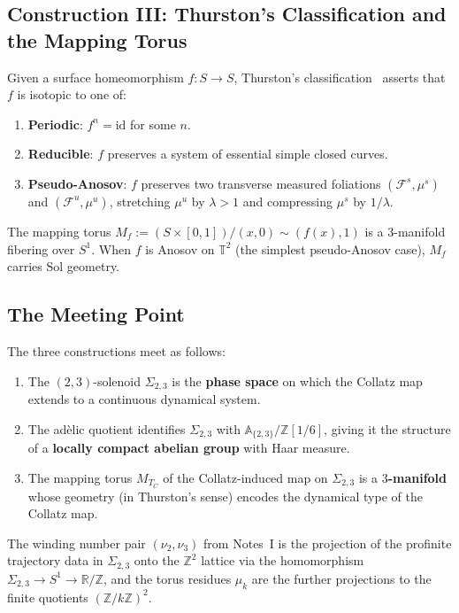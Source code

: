 \documentclass[11pt,a4paper]{article}
\newcommand{\Z}{\mathbb{Z}}
\newcommand{\R}{\mathbb{R}}
\newcommand{\T}{\mathbb{T}}
\newcommand{\A}{\mathbb{A}}
\newcommand{\Sol}{\mathrm{Sol}}
\theoremstyle{plain}
\theoremstyle{definition}
\begin{document}
\subsection{Construction III: Thurston's Classification and the Mapping Torus}

Given a surface homeomorphism $f: S \to S$, Thurston's classification~\cite{Thurston1988} asserts that $f$ is isotopic to one of:
\begin{enumerate}[label=(\roman*)]
    \item \textbf{Periodic}: $f^n = \mathrm{id}$ for some $n$.
    \item \textbf{Reducible}: $f$ preserves a system of essential simple closed curves.
    \item \textbf{Pseudo-Anosov}: $f$ preserves two transverse measured foliations $(\mathcal{F}^s, \mu^s)$ and $(\mathcal{F}^u, \mu^u)$, stretching $\mu^u$ by $\lambda > 1$ and compressing $\mu^s$ by $1/\lambda$.
\end{enumerate}
The mapping torus $M_f := (S \times [0,1]) / (x,0) \sim (f(x),1)$ is a $3$-manifold fibering over $S^1$. When $f$ is Anosov on $\T^2$ (the simplest pseudo-Anosov case), $M_f$ carries $\Sol$ geometry.


\subsection{The Meeting Point}

\begin{mainresult}
The three constructions meet as follows:
\begin{enumerate}
    \item The $(2,3)$-solenoid $\Sigma_{2,3}$ is the \textbf{phase space} on which the Collatz map extends to a continuous dynamical system.

    \item The ad\`elic quotient identifies $\Sigma_{2,3}$ with $\A_{\{2,3\}} / \Z[1/6]$, giving it the structure of a \textbf{locally compact abelian group} with Haar measure.

    \item The mapping torus $M_{T_C}$ of the Collatz-induced map on $\Sigma_{2,3}$ is a \textbf{$3$-manifold} whose geometry (in Thurston's sense) encodes the dynamical type of the Collatz map.
\end{enumerate}

The winding number pair $(\nu_2, \nu_3)$ from Notes~I is the projection of the profinite trajectory data in $\Sigma_{2,3}$ onto the $\Z^2$ lattice via the homomorphism $\Sigma_{2,3} \to S^1 \to \R/\Z$, and the torus residues $\mu_k$ are the further projections to the finite quotients $(\Z/k\Z)^2$.
\end{mainresult}
\end{document}
